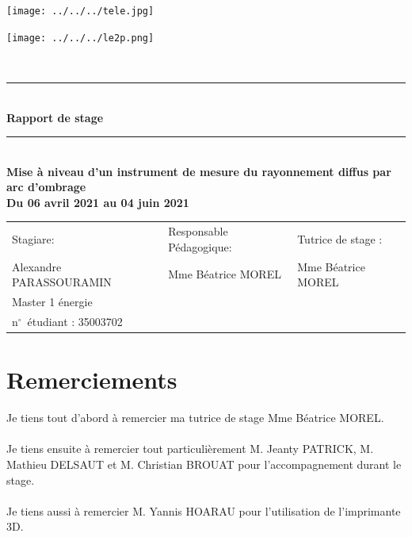 \documentclass[12pt,a4paper]{article}
\begin{document}
\begin{titlepage}
\begin{minipage}[c]{.46\linewidth}
     \begin{center}
         \texttt{[image: ../../../tele.jpg]}   
         
         \end{center}
   \end{minipage} \hfill
   \begin{minipage}[c]{.46\linewidth}
    \begin{center}
       \texttt{[image: ../../../le2p.png]}   
        \end{center}
 \end{minipage}
\newcommand{\HRule}{\rule{\linewidth}{0.5mm}}
\center
\textsc{\LARGE} \\[3cm]

\HRule \\[0.4cm]
{ \huge \bfseries Rapport de stage\\ [0.15cm] }
\HRule \\[1cm]

\textbf{ Mise à niveau d'un instrument de mesure du rayonnement diffus par arc d’ombrage}\\[1cm]
\textbf{ Du 06 avril 2021 au 04 juin 2021}\\[8cm]
\begin{tabular}{lll}
   \sf Stagiare: &\sf Responsable Pédagogique: &\sf Tutrice de stage : \\
  \sf Alexandre PARASSOURAMIN &\sf Mme Béatrice MOREL &\sf Mme Béatrice MOREL \\
   \sf Master 1 énergie& &\\
  \sf n$^\circ$~étudiant : 35003702& & \\
\end{tabular}




\end{titlepage}
\newpage
\thispagestyle{empty}

\section*{Remerciements}
\sf
Je tiens tout d'abord à remercier ma tutrice de stage Mme Béatrice MOREL.\\
~\\
Je tiens ensuite à remercier tout particulièrement M. Jeanty PATRICK, M. Mathieu DELSAUT et M. Christian BROUAT pour l'accompagnement durant le stage.\\
~\\
Je tiens aussi à remercier M. Yannis HOARAU pour l'utilisation de l'imprimante 3D.
 
\end{document}
